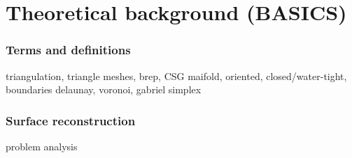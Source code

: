 \chapter{Theoretical background (BASICS)}

\subsection{Terms and definitions}

triangulation,
triangle meshes,
brep, CSG
maifold, oriented, closed/water-tight, boundaries
delaunay, voronoi, gabriel simplex


\subsection{Surface reconstruction}
problem analysis




